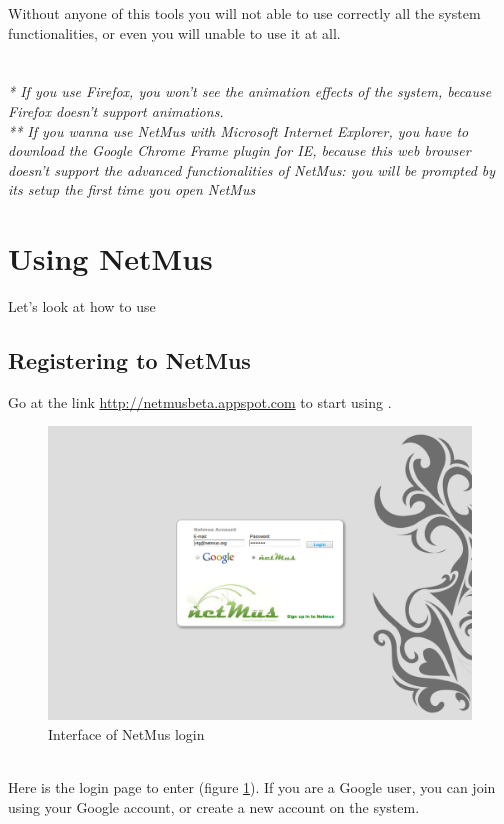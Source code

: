 Without anyone of this tools you will not able to use
correctly all the system functionalities, or even you will unable to use
it at all.\\
\\
\\

\emph{* If you use Firefox, you won't see the animation effects of the
system, because Firefox doesn't support animations.}\\ 
\emph{** If you wanna use NetMus with Microsoft Internet Explorer, you have to
download the Google Chrome Frame plugin for IE, because this web browser doesn't
support the advanced functionalities of NetMus: you will be prompted by its
setup the first time you open NetMus}\\

\newpage
\section{Using NetMus}
Let's look at how to use 

\subsection{Registering to NetMus}

Go at the link \url{http://netmusbeta.appspot.com} to start using .\\
\begin{figure}[!htbp]
  \centering
  \includegraphics[width=14cm]{img/MU/login.png}
\caption{Interface of NetMus login}
\label{fig:login}
\end{figure}
\\
Here is the login page to enter  (figure \ref{fig:login}). If you are
a Google user, you can join  using your Google account, or create a
new account on the system.

